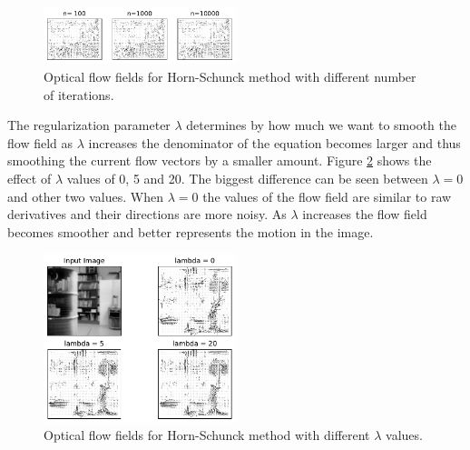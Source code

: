 \documentclass[9pt]{IEEEtran}
\begin{document}
\begin{figure}[H]
    \centering
    \includegraphics[width=0.5\textwidth]{HS_iter.pdf}
    \vspace{-15px}
    \caption{Optical flow fields for Horn-Schunck method with different number of iterations.}
    \label{hs-iterations}
\end{figure}

The regularization parameter $\lambda$ determines by how much we want to smooth the flow field as $\lambda$ increases the denominator of the equation becomes larger and thus smoothing the current flow vectors by a smaller amount.
Figure \ref{hs-lambda} shows the effect of $\lambda$ values of 0, 5 and 20. 
The biggest difference can be seen between $\lambda=0$ and other two values.
When $\lambda=0$ the values of the flow field are similar to raw derivatives and their directions are more noisy.
As $\lambda$ increases the flow field becomes smoother and better represents the motion in the image.
\begin{figure}[H]
    \centering
    \includegraphics[width=0.5\textwidth]{HS_lambda.pdf}
    \vspace{-15px}
    \caption{Optical flow fields for Horn-Schunck method with different $\lambda$ values.}
    \label{hs-lambda}
\end{figure}
\end{document}
